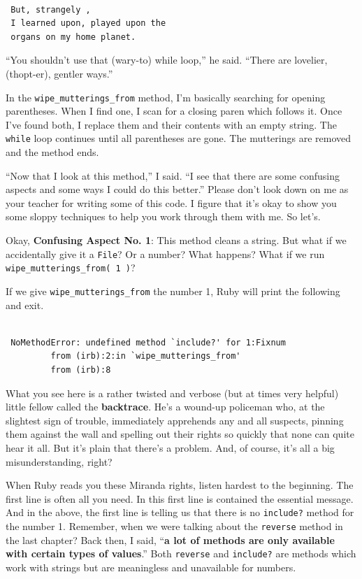 \documentclass[10pt,twoside]{report}
\begin{document}
\begin{lstlisting}

 But, strangely ,
 I learned upon, played upon the
 organs on my home planet.

\end{lstlisting}


``You shouldn't use that (wary-to) while loop,'' he said.  ``There are
lovelier, (thopt-er), gentler ways.''

In the \lstinline[breaklines=true]|wipe_mutterings_from| method, I'm
basically searching for opening parentheses.  When I find one, I scan
for a closing paren which follows it.  Once I've found both, I replace
them and their contents with an empty string.  The
\lstinline[breaklines=true]|while| loop continues until all
parentheses are gone. The mutterings are removed and the method ends.

``Now that I look at this method,'' I said.  ``I see that there are
some confusing aspects and some ways I could do this better.''  Please
don't look down on me as your teacher for writing some of this code.
I figure that it's okay to show you some sloppy techniques to help you
work through them with me.  So let's.

Okay, {\bf Confusing Aspect No. 1}: This method cleans a string.  But
what if we accidentally give it a \lstinline[breaklines=true]|File|?
Or a number?  What happens?  What if we run
\lstinline[breaklines=true]|wipe_mutterings_from( 1 )|?

If we give \lstinline[breaklines=true]|wipe_mutterings_from| the
number 1, Ruby will print the following and exit.


\begin{lstlisting}

 NoMethodError: undefined method `include?' for 1:Fixnum
         from (irb):2:in `wipe_mutterings_from'
         from (irb):8

\end{lstlisting}


What you see here is a rather twisted and verbose (but at times very
helpful) little fellow called the {\bf backtrace}.  He's a wound-up
policeman who, at the slightest sign of trouble, immediately
apprehends any and all suspects, pinning them against the wall and
spelling out their rights so quickly that none can quite hear it all.
But it's plain that there's a problem.  And, of course, it's all a big
misunderstanding, right?

When Ruby reads you these Miranda rights, listen hardest to the
beginning.  The first line is often all you need.  In this first line
is contained the essential message.  And in the above, the first line
is telling us that there is no \lstinline[breaklines=true]|include?|
method for the number 1. Remember, when we were talking about the
\lstinline[breaklines=true]|reverse| method in the last chapter?  Back
then, I said, ``{\bf a lot of methods are only available with certain
  types of values}.''  Both \lstinline[breaklines=true]|reverse| and
\lstinline[breaklines=true]|include?| are methods which work with
strings but are meaningless and unavailable for numbers.
\end{document}
